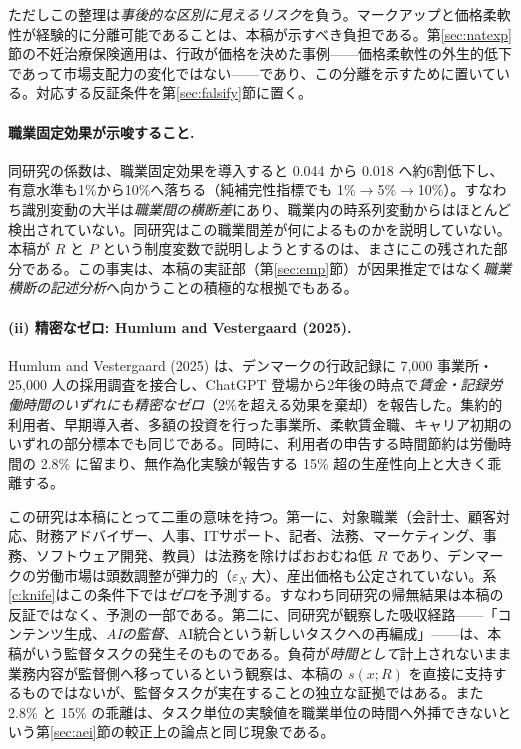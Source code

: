 \documentclass[11pt]{article}
\theoremstyle{plain}
\theoremstyle{definition}
\theoremstyle{remark}
\begin{document}
ただしこの整理は\emph{事後的な区別に見えるリスク}を負う。マークアップと価格柔軟性が経験的に分離可能であることは、本稿が示すべき負担である。第\ref{sec:natexp}節の不妊治療保険適用は、行政が価格を決めた事例——価格柔軟性の外生的低下であって市場支配力の変化ではない——であり、この分離を示すために置いている。対応する反証条件を第\ref{sec:falsify}節に置く。

\paragraph{職業固定効果が示唆すること.}
同研究の係数は、職業固定効果を導入すると 0.044 から 0.018 へ約6割低下し、有意水準も1\%から10\%へ落ちる（純補完性指標でも 1\%$\to$5\%$\to$10\%）。すなわち識別変動の大半は\emph{職業間の横断差}にあり、職業内の時系列変動からはほとんど検出されていない。同研究はこの職業間差が何によるものかを説明していない。本稿が $R$ と $P$ という制度変数で説明しようとするのは、まさにこの残された部分である。この事実は、本稿の実証部（第\ref{sec:emp}節）が因果推定ではなく\emph{職業横断の記述分析}へ向かうことの積極的な根拠でもある。

\paragraph{(ii) 精密なゼロ: Humlum and Vestergaard (2025).}
Humlum and Vestergaard (2025) は、デンマークの行政記録に 7{,}000 事業所・25{,}000 人の採用調査を接合し、ChatGPT 登場から2年後の時点で\emph{賃金・記録労働時間のいずれにも精密なゼロ}（2\%を超える効果を棄却）を報告した。集約的利用者、早期導入者、多額の投資を行った事業所、柔軟賃金職、キャリア初期のいずれの部分標本でも同じである。同時に、利用者の申告する時間節約は労働時間の 2.8\% に留まり、無作為化実験が報告する 15\% 超の生産性向上と大きく乖離する。

この研究は本稿にとって二重の意味を持つ。第一に、対象職業（会計士、顧客対応、財務アドバイザー、人事、ITサポート、記者、法務、マーケティング、事務、ソフトウェア開発、教員）は法務を除けばおおむね低 $R$ であり、デンマークの労働市場は頭数調整が弾力的（$\varepsilon_N$ 大）、産出価格も公定されていない。系\ref{c:knife}はこの条件下では\emph{ゼロ}を予測する。すなわち同研究の帰無結果は本稿の反証ではなく、予測の一部である。第二に、同研究が観察した吸収経路——「コンテンツ生成、\emph{AIの監督}、AI統合という新しいタスクへの再編成」——は、本稿がいう監督タスクの発生そのものである。負荷が\emph{時間として}計上されないまま業務内容が監督側へ移っているという観察は、本稿の $s(x;R)$ を直接に支持するものではないが、監督タスクが実在することの独立な証拠ではある。また 2.8\% と 15\% の乖離は、タスク単位の実験値を職業単位の時間へ外挿できないという第\ref{sec:aei}節の較正上の論点と同じ現象である。
\end{document}
